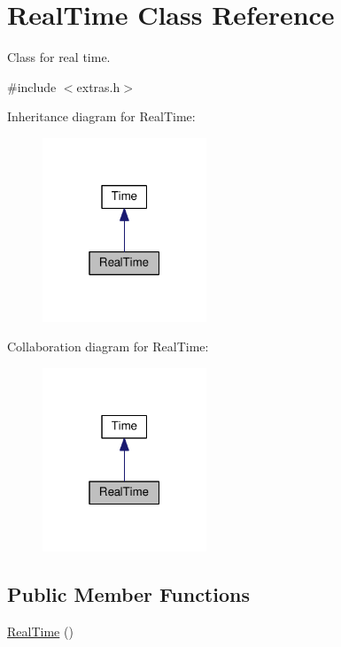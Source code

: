 \hypertarget{classRealTime}{}\section{Real\+Time Class Reference}
\label{classRealTime}


Class for real time.  




{\ttfamily \#include $<$extras.\+h$>$}



Inheritance diagram for Real\+Time\+:
\nopagebreak
\begin{figure}[H]
\begin{center}
\leavevmode
\includegraphics[width=139pt]{classRealTime__inherit__graph}
\end{center}
\end{figure}


Collaboration diagram for Real\+Time\+:
\nopagebreak
\begin{figure}[H]
\begin{center}
\leavevmode
\includegraphics[width=139pt]{classRealTime__coll__graph}
\end{center}
\end{figure}
\subsection*{Public Member Functions}
\begin{DoxyCompactItemize}
\item 
\hyperlink{classRealTime_a29d66ec5bf923f03f31143941bfebc83}{Real\+Time} ()
\end{DoxyCompactItemize}
